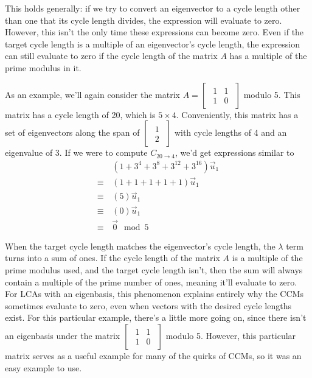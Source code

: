 \documentclass[a4paper, 12pt, reqno]{amsart}
\begin{document}
	This holds generally: if we try to convert an eigenvector to a cycle length other than one that its cycle length divides, the expression will evaluate to zero. However,
	this isn't the only time these expressions can become zero. Even if the target cycle length is a multiple of an eigenvector's cycle length, the expression can still 
	evaluate to zero if the cycle length of the matrix $A$ has a multiple of the prime modulus in it.
	
	As an example, we'll again consider the matrix $A = 
	\begin{bmatrix}
		\begin{smallmatrix}
			1 & 1 \\
			1 & 0
		\end{smallmatrix}
	\end{bmatrix}$ modulo 5. This matrix has a cycle length of 20, which is $5 \times 4$. Conveniently, this matrix has a set of eigenvectors along the span of
	$\begin{bmatrix}
		\begin{smallmatrix}
			1 \\
			2
		\end{smallmatrix}
	\end{bmatrix}$ with cycle lengths of 4 and an eigenvalue of 3. If we were to compute $C_{20 \rightarrow 4}$, we'd get expressions similar to
	\begin{align*}
		       & \, (1 + 3^{4} + 3^{8} + 3^{12} + 3^{16})\vec{u}_{1} \\
		\equiv & \, (1 + 1 + 1 + 1 + 1)\vec{u}_{1}                   \\
		\equiv & \, (5)\vec{u}_{1}                                   \\
		\equiv & \, (0)\vec{u}_{1}                                   \\
		\equiv & \, \vec{0} \mod{5}
	\end{align*}
	
	When the target cycle length matches the eigenvector's cycle length, the $\lambda$ term turns into a sum of ones. If the cycle length of the matrix $A$ is a multiple
	of the prime modulus used, and the target cycle length isn't, then the sum will always contain a multiple of the prime number of ones, meaning it'll evaluate to
	zero. For LCAs with an eigenbasis, this phenomenon explains entirely why the CCMs sometimes evaluate to zero, even when vectors with the desired cycle lengths exist.
	For this particular example, there's a little more going on, since there isn't an eigenbasis under the matrix 
	$\begin{bmatrix}
		\begin{smallmatrix}
			1 & 1 \\
			1 & 0
		\end{smallmatrix}
	\end{bmatrix}$ modulo 5. However, this particular matrix serves as a useful example for many of the quirks of CCMs, so it was an easy example to use.
	
\end{document}
